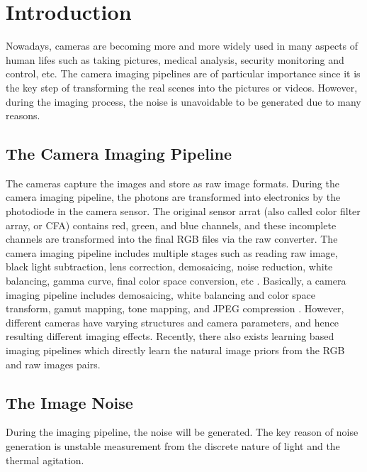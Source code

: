%
\chapter{Introduction}
\label{sec:intro}



Nowadays, cameras are becoming more and more widely used in many aspects of human lifes such as taking pictures, medical analysis, security monitoring and control, etc. The camera imaging pipelines are of particular importance since it is the key step of transforming the real scenes into the pictures or videos. However, during the imaging process, the noise is unavoidable to be generated due to many reasons.

\section{The Camera Imaging Pipeline}
\label{sec:intro:general}

The cameras capture the images and store as raw image formats. During the camera imaging pipeline, the photons are transformed into electronics by the photodiode in the camera sensor. The original sensor arrat (also called color filter array, or CFA) contains red, green, and blue channels, and these incomplete channels are transformed into the final RGB files via the raw converter. The camera imaging pipeline includes multiple stages such as reading raw image, black light subtraction, lens correction, demosaicing, noise reduction, white balancing, gamma curve, final color space conversion, etc \cite{browneccv2016}. Basically, a camera imaging pipeline includes demosaicing, white balancing and color space transform, gamut mapping, tone mapping, and JPEG compression \cite{crosschannel}. However, different cameras have varying structures and camera parameters, and hence resulting different imaging effects. Recently, there also exists learning based imaging pipelines which directly learn the  natural image priors from the RGB and raw images pairs.


\section{The Image Noise}
\label{sec:intro:current}

During the imaging pipeline, the noise will be generated. The key reason of noise generation is unstable measurement from the discrete nature of light and the thermal agitation. 

